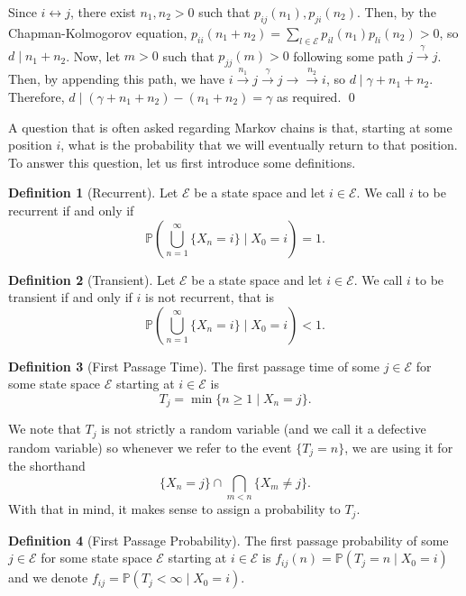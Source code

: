 \documentclass[
]{article}
\theoremstyle{definition}
\newtheorem{definition}{Definition}[section]
\begin{document}
Since \(i \leftrightarrow j\), there exist \(n_1, n_2 > 0\) such that
\(p_{ij}(n_1), p_{ji}(n_2)\). Then, by the Chapman-Kolmogorov equation,
\(p_{ii}(n_1 + n_2) = \sum_{l \in \mathcal{E}} p_{il}(n_1)p_{li}(n_2) > 0\),
so \(d \mid n_1 + n_2\). Now, let \(m > 0\) such that \(p_{jj}(m) > 0\)
following some path \(j \xrightarrow{\gamma} j\). Then, by appending
this path, we have
\(i \xrightarrow{n_1} j \xrightarrow{\gamma} j \to \xrightarrow{n_2} i\),
so \(d \mid \gamma + n_1 + n_2\). Therefore,
\(d \mid (\gamma + n_1 + n_2) - (n_1 + n_2) = \gamma\) as required. \qed

A question that is often asked regarding Markov chains is that, starting
at some position \(i\), what is the probability that we will eventually
return to that position. To answer this question, let us first introduce
some definitions.

\begin{definition}[Recurrent]
  Let \(\mathcal{E}\) be a state space and let \(i \in \mathcal{E}\). We call 
  \(i\) to be recurrent if and only if 
  \[\mathbb{P}\left(\bigcup_{n = 1}^\infty \{X_n = i\} \mid X_0 = i\right) = 1.\]
\end{definition}

\begin{definition}[Transient]
  Let \(\mathcal{E}\) be a state space and let \(i \in \mathcal{E}\). We call 
  \(i\) to be transient if and only if \(i\) is not recurrent, that is
  \[\mathbb{P}\left(\bigcup_{n = 1}^\infty \{X_n = i\} \mid X_0 = i\right) < 1.\]
\end{definition}

\begin{definition}[First Passage Time]
  The first passage time of some \(j \in \mathcal{E}\) for some state space 
  \(\mathcal{E}\) starting at \(i \in \mathcal{E}\) is 
  \[T_j = \min\{n \ge 1 \mid X_n = j\}.\]
\end{definition}

We note that \(T_j\) is not strictly a random variable (and we call it a
defective random variable) so whenever we refer to the event
\(\{T_j = n\}\), we are using it for the shorthand
\[\{X_n = j\} \cap \bigcap_{m < n} \{X_m \neq j\}. \] With that in mind,
it makes sense to assign a probability to \(T_j\).

\begin{definition}[First Passage Probability]
  The first passage probability of some \(j \in \mathcal{E}\) for some state space 
  \(\mathcal{E}\) starting at \(i \in \mathcal{E}\) is
  \(f_{ij}(n) = \mathbb{P}(T_j = n \mid X_0 = i)\)
  and we denote \(f_{ij} = \mathbb{P}(T_j < \infty \mid X_0 = i)\).
\end{definition}
\end{document}
